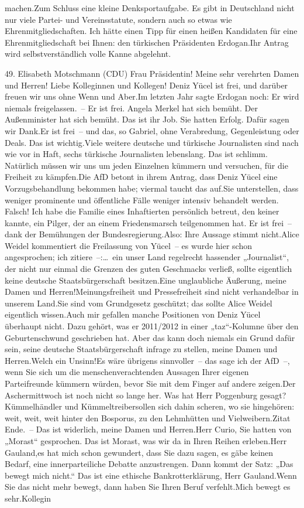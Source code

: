 \documentclass{article}
\begin{document}
machen.Zum Schluss eine kleine Denksportaufgabe. Es gibt in Deutschland nicht nur viele Partei- und Vereinsstatute, sondern auch so etwas wie Ehrenmitgliedschaften. Ich hätte einen Tipp für einen heißen Kandidaten für eine Ehrenmitgliedschaft bei Ihnen: den türkischen Präsidenten Erdogan.Ihr Antrag wird selbstverständlich volle Kanne abgelehnt.




	49. Elisabeth Motschmann (CDU) Frau Präsidentin! Meine sehr verehrten Damen und Herren! Liebe Kolleginnen und Kollegen! Deniz Yücel ist frei, und darüber freuen wir uns ohne Wenn und Aber.Im letzten Jahr sagte Erdogan noch: Er wird niemals freigelassen. – Er ist frei. Angela Merkel hat sich bemüht. Der Außenminister hat sich bemüht. Das ist ihr Job. Sie hatten Erfolg. Dafür sagen wir Dank.Er ist frei – und das, so Gabriel, ohne Verabredung, Gegenleistung oder Deals. Das ist wichtig.Viele weitere deutsche und türkische Journalisten sind nach wie vor in Haft, sechs türkische Journalisten lebenslang. Das ist schlimm. Natürlich müssen wir uns um jeden Einzelnen kümmern und versuchen, für die Freiheit zu kämpfen.Die AfD betont in ihrem Antrag, dass Deniz Yücel eine Vorzugsbehandlung bekommen habe; viermal taucht das auf.Sie unterstellen, dass weniger prominente und öffentliche Fälle weniger intensiv behandelt werden. Falsch! Ich habe die Familie eines Inhaftierten persönlich betreut, den keiner kannte, ein Pilger, der an einem Friedensmarsch teilgenommen hat. Er ist frei – dank der Bemühungen der Bundesregierung.Also: Ihre Aussage stimmt nicht.Alice Weidel kommentiert die Freilassung von Yücel – es wurde hier schon angesprochen; ich zitiere –:… ein unser Land regelrecht hassender „Journalist“, der nicht nur einmal die Grenzen des guten Geschmacks verließ, sollte eigentlich keine deutsche Staatsbürgerschaft besitzen.Eine unglaubliche Äußerung, meine Damen und Herren!Meinungsfreiheit und Pressefreiheit sind nicht verhandelbar in unserem Land.Sie sind vom Grundgesetz geschützt; das sollte Alice Weidel eigentlich wissen.Auch mir gefallen manche Positionen von Deniz Yücel überhaupt nicht. Dazu gehört, was er 2011/2012 in einer „taz“-Kolumne über den Geburtenschwund geschrieben hat. Aber das kann doch niemals ein Grund dafür sein, seine deutsche Staatsbürgerschaft infrage zu stellen, meine Damen und Herren.Welch ein Unsinn!Es wäre übrigens sinnvoller – das sage ich der AfD –, wenn Sie sich um die menschenverachtenden Aussagen Ihrer eigenen Parteifreunde kümmern würden, bevor Sie mit dem Finger auf andere zeigen.Der Aschermittwoch ist noch nicht so lange her. Was hat Herr Poggenburg gesagt? Kümmelhändler und Kümmeltreibersollen sich dahin scheren, wo sie hingehören: weit, weit, weit hinter den Bosporus, zu den Lehmhütten und Vielweibern.Zitat Ende. – Das ist widerlich, meine Damen und Herren.Herr Curio, Sie hatten von „Morast“ gesprochen. Das ist Morast, was wir da in Ihren Reihen erleben.Herr Gauland,es hat mich schon gewundert, dass Sie dazu sagen, es gäbe keinen Bedarf, eine innerparteiliche Debatte anzustrengen. Dann kommt der Satz: „Das bewegt mich nicht.“ Das ist eine ethische Bankrotterklärung, Herr Gauland.Wenn Sie das nicht mehr bewegt, dann haben Sie Ihren Beruf verfehlt.Mich bewegt es sehr.Kollegin 
\end{document}
